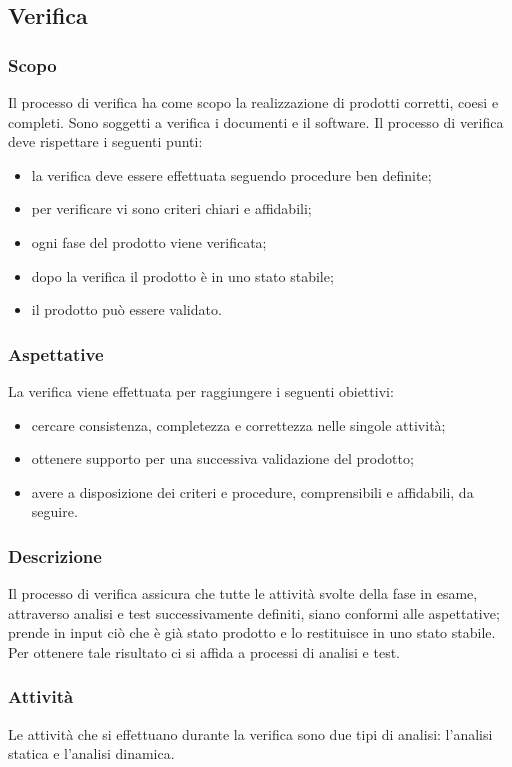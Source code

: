 \subsection{Verifica}
\subsubsection{Scopo}
Il processo di verifica ha come scopo la realizzazione di prodotti corretti, coesi e completi. Sono soggetti a verifica i documenti e il software.
Il processo di verifica deve rispettare i seguenti punti: \begin{itemize}
\item la verifica deve essere effettuata seguendo procedure ben definite;
\item per verificare vi sono criteri chiari e affidabili;
\item ogni fase del prodotto viene verificata;
\item dopo la verifica il prodotto è in uno stato stabile;
\item il prodotto può essere validato.
\end{itemize}

\subsubsection{Aspettative}
La verifica viene effettuata per raggiungere i seguenti obiettivi: \begin{itemize}
\item cercare consistenza, completezza e correttezza nelle singole attività;
\item ottenere supporto per una successiva validazione del prodotto;
\item avere a disposizione dei criteri e procedure, comprensibili e affidabili, da seguire.
\end{itemize}

\subsubsection{Descrizione}
Il processo di verifica assicura che tutte le attività svolte della fase in esame, attraverso analisi e test successivamente definiti, siano conformi alle aspettative; prende in input ciò che è già stato prodotto e lo restituisce in uno stato stabile. \\
Per ottenere tale risultato ci si affida a processi di analisi e test.

\subsubsection{Attività}
Le attività che si effettuano durante la verifica sono due tipi di analisi: l’analisi statica e l’analisi dinamica.

